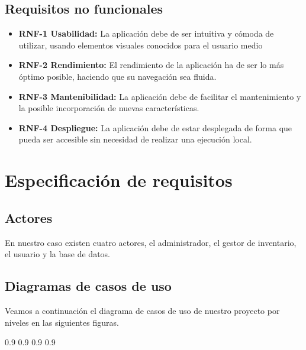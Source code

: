 \subsection{Requisitos no funcionales}

\begin{itemize}
\item \textbf{RNF-1 Usabilidad:} La aplicación debe de ser intuitiva y cómoda de utilizar, usando elementos visuales conocidos para el usuario medio

\item \textbf{RNF-2 Rendimiento:} El rendimiento de la aplicación ha de ser lo más óptimo posible, haciendo que su navegación sea fluida.

\item \textbf{RNF-3 Mantenibilidad:} La aplicación debe de facilitar el mantenimiento y la posible incorporación de nuevas características.

\item \textbf{RNF-4 Despliegue:} La aplicación debe de estar desplegada de forma que pueda ser accesible sin necesidad de realizar una ejecución local.

\end{itemize}


\section{Especificación de requisitos}

\subsection{Actores}

En nuestro caso existen cuatro actores, el administrador, el gestor de inventario, el usuario y la base de datos.

\subsection{Diagramas de casos de uso}

Veamos a continuación el diagrama de casos de uso de nuestro proyecto por niveles en las siguientes figuras.

 {0.9}
 {0.9}
 {0.9}
 {0.9}

